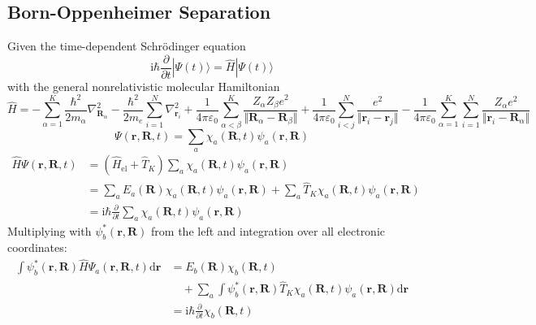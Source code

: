 \documentclass[9pt]{report}
\begin{document}
\subsection{Born-Oppenheimer Separation}
Given the time-dependent Schrödinger equation
\begin{equation}
\mathrm{i}\hbar\frac{\partial}{\partial t}|\Psi(t)\rangle = \hat{H}|\Psi(t)\rangle
\end{equation}
with the general nonrelativistic molecular Hamiltonian
\begin{equation}
\hat{H} = -\sum_{\alpha=1}^{K}\frac{\hbar^2}{2m_{\alpha}}\nabla_{\boldsymbol{R}_{\alpha}}^{2} -\frac{\hbar^2}{2m_e}\sum_{i=1}^{N}\nabla_{\boldsymbol{r}_{i}}^{2}+\frac{1}{4\pi\varepsilon_0}\sum_{\alpha<\beta}^{K}\frac{Z_{\alpha}Z_{\beta}e^2}{\Vert\boldsymbol{R}_{\alpha}-\boldsymbol{R}_{\beta}\Vert}+\frac{1}{4\pi\varepsilon_0}\sum_{i<j}^{N}\frac{e^2}{\Vert\boldsymbol{r}_{i}-\boldsymbol{r}_{j}\Vert}-\frac{1}{4\pi\varepsilon_0}\sum_{\alpha=1}^{K}\sum_{i=1}^{N}\frac{Z_{\alpha}e^2}{\Vert\boldsymbol{r}_{i}-\boldsymbol{R}_{\alpha}\Vert}
\end{equation}
\begin{equation}
\Psi(\boldsymbol{r},\boldsymbol{R},t)=\sum_{a}\chi_{a}(\boldsymbol{R},t)\psi_{a}(\boldsymbol{r},\boldsymbol{R})
\end{equation}
\begin{align}
\hat{H}\Psi(\boldsymbol{r},\boldsymbol{R},t) &= (\hat{H}_{\mathrm{el}}+\hat{T}_{K})\sum_{a}\chi_{a}(\boldsymbol{R},t)\psi_{a}(\boldsymbol{r},\boldsymbol{R})\\
&= \sum_{a}E_{a}(\boldsymbol{R})\chi_{a}(\boldsymbol{R},t)\psi_{a}(\boldsymbol{r},\boldsymbol{R})+\sum_{a}\hat{T}_{K}\chi_{a}(\boldsymbol{R},t)\psi_{a}(\boldsymbol{r},\boldsymbol{R})\\
&=\mathrm{i}\hbar\frac{\partial}{\partial t}\sum_{a}\chi_{a}(\boldsymbol{R},t)\psi_{a}(\boldsymbol{r},\boldsymbol{R})
\end{align}
Multiplying with $\psi_{b}^{*}(\boldsymbol{r},\boldsymbol{R})$ from the left and integration over all electronic coordinates:
\begin{align}
\int\psi_{b}^{*}(\boldsymbol{r},\boldsymbol{R})\hat{H}\Psi_{a}(\boldsymbol{r},\boldsymbol{R},t)\mathrm{d}\boldsymbol{r} &= E_{b}(\boldsymbol{R})\chi_{b}(\boldsymbol{R},t)\\
&\quad+\sum_{a}\int\psi_{b}^{*}(\boldsymbol{r},\boldsymbol{R})\hat{T}_{K}\chi_{a}(\boldsymbol{R},t)\psi_{a}(\boldsymbol{r},\boldsymbol{R})\mathrm{d}\boldsymbol{r}\label{nonadiabaticity}\\
&=\mathrm{i}\hbar\frac{\partial}{\partial t}\chi_{b}(\boldsymbol{R},t)
\end{align}
\end{document}
